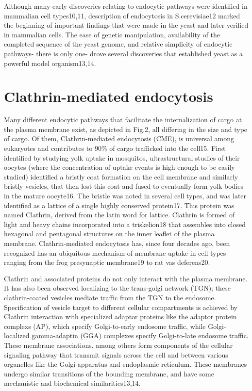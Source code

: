 \vspace{5mm}
Although many early discoveries relating to endocytic pathways were identified in mammalian cell types10,11, description of endocytosis in S.cerevisiae12 marked the beginning of important findings that were made in the yeast and later verified in mammalian cells. The ease of genetic manipulation, availability of the completed sequence of the yeast genome, and relative simplicity of endocytic pathways- there is only one- drove several discoveries that established yeast as a powerful model organism13,14.



\section{Clathrin-mediated endocytosis}
Many different endocytic pathways that facilitate the internalization of cargo at the plasma membrane exist, as depicted in Fig.2, all differing in the size and type of cargo. Of them, Clathrin-mediated endocytosis (CME), is universal among eukaryotes and contributes to 90\% of cargo trafficked into the cell15. First identified by studying yolk uptake in mosquitos, ultrastructural studies of their oocytes (where the concentration of uptake events is high enough to be easily studied) identified a bristly coat formation on the cell membrane and similarly bristly vesicles, that then lost this coat and fused to eventually form yolk bodies in the mature oocyte16. The bristle was noted in several cell types, and was later identified as a lattice of a single highly conserved protein17. This protein was named Clathrin, derived from the latin word for lattice. Clathrin is formed of light and heavy chains incorporated into a triskelion18 that assembles into closed hexagonal and pentagonal structures on the inner leaflet of the plasma membrane. Clathrin-mediated endocytosis has, since four decades ago, been recognized has an ubiquitous mechanism of membrane uptake in cell types ranging from the frog presynaptic membrane19 to rat vas deferens20. 

\vspace{5mm}
Clathrin and associated proteins do not only interact with the plasma membrane. It has also been observed localizing to the trans-golgi network (TGN); these clathrin-coated vesicles mediate traffic from the TGN to the endosome. Specification of vesicle target to different cellular compartments is achieved by Clathrin interaction with specialized adaptor proteins like the adaptor protein complexs (AP), which specify Golgi-to-early endosome traffic, while Golgi-localized gamma-adaptin (GGA) complexes specify Golgi-to-late endosome traffic. These membrane associations, among others form components of the cellular signaling pathway that transmit signals across the cell and between various organelles like the Golgi apparatus and endoplasmic reticulum. These membranes undergo similar transitions of the bounding membrane, and have some mechanistic and biochemical similarities13,14. 

